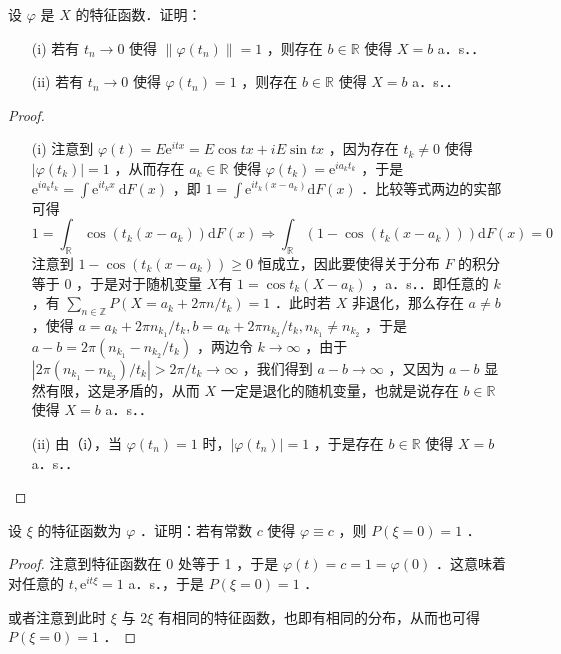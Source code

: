 \begin{exercise}
    设 $\varphi$ 是 $X$ 的特征函数．证明：
    \begin{enumerate}
        \item[(i)] 若有 $t_n \rightarrow 0$ 使得 $\left\|\varphi\left(t_n\right)\right\|=1$ ，则存在 $b \in \mathbb{R}$ 使得 $X=b$ a．s．．
        \item[(ii)] 若有 $t_n \rightarrow 0$ 使得 $\varphi\left(t_n\right)=1$ ，则存在 $b \in \mathbb{R}$ 使得 $X=b$ a．s．．
    \end{enumerate}
\end{exercise}
\begin{proof}
    \begin{enumerate}
        \item[(i)] 注意到 $\varphi(t)=E \mathrm{e}^{i t x}=E \cos t x+i E \sin t x$ ，因为存在 $t_k \neq 0$ 使得 $\left|\varphi\left(t_k\right)\right|=1$ ，从而存在 $a_k \in \mathbb{R}$ 使得 $\varphi\left(t_k\right)=\mathrm{e}^{i a_k t_k}$ ，于是 $\mathrm{e}^{i a_k t_k}=\int \mathrm{e}^{i t_k x} \mathrm{~d} F(x)$ ，即 $1=\int \mathrm{e}^{i t_k\left(x-a_k\right)} \mathrm{d} F(x)$ ．比较等式两边的实部可得
            $$
                1=\int_{\mathbb{R}} \cos \left(t_k\left(x-a_k\right)\right) \mathrm{d} F(x) \Rightarrow \int_{\mathbb{R}}\left(1-\cos \left(t_k\left(x-a_k\right)\right)\right) \mathrm{d} F(x)=0
            $$
            注意到 $1-\cos \left(t_k\left(x-a_k\right)\right) \geq 0$ 恒成立，因此要使得关于分布 $F$ 的积分等于 0 ，于是对于随机变量 $X$有 $1=\cos t_k\left(X-a_k\right)$ ，a．s．．即任意的 $k$ ，有 $\sum_{n \in \mathbb{Z}} P\left(X=a_k+2 \pi n / t_k\right)=1$ ．此时若 $X$ 非退化，那么存在 $a \neq b$ ，使得 $a=a_k+2 \pi n_{k_1} / t_k, b=a_k+2 \pi n_{k_2} / t_k, n_{k_1} \neq n_{k_2}$ ，于是 $a-b=2 \pi\left(n_{k_1}-n_{k_2} / t_k\right)$ ，两边令 $k \rightarrow \infty$ ，由于 $\left|2 \pi\left(n_{k_1}-n_{k_2}\right) / t_k\right|>2 \pi / t_k \rightarrow \infty$ ，我们得到 $a-b \rightarrow \infty$ ，又因为 $a-b$ 显然有限，这是矛盾的，从而 $X$ 一定是退化的随机变量，也就是说存在 $b \in \mathbb{R}$ 使得 $X=b$ a．s．．
        \item[(ii)] 由（i），当 $\varphi\left(t_n\right)=1$ 时，$\left|\varphi\left(t_n\right)\right|=1$ ，于是存在 $b \in \mathbb{R}$ 使得 $X=b$ a．s．．
    \end{enumerate}
\end{proof}

\begin{exercise}
    设 $\xi$ 的特征函数为 $\varphi$ ．证明：若有常数 $c$ 使得 $\varphi \equiv c$ ，则 $P(\xi=0)=1$ ．
\end{exercise}
\begin{proof}
    注意到特征函数在 0 处等于 1 ，于是 $\varphi(t)=c=1=\varphi(0)$ ．这意味着对任意的 $t, \mathrm{e}^{i t \xi}=1$ a．s．，于是 $P(\xi=0)=1$ ．

    或者注意到此时 $\xi$ 与 $2 \xi$ 有相同的特征函数，也即有相同的分布，从而也可得 $P(\xi=0)=1$ ．
\end{proof}

